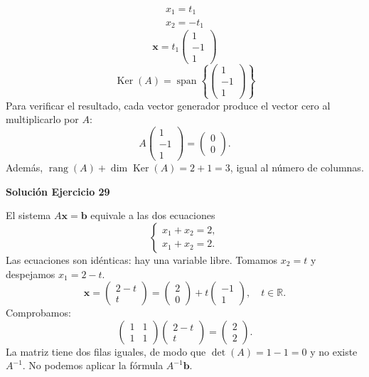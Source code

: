 \documentclass[12pt]{article}
\newcommand{\rang}{\operatorname{rang}}
\newcommand{\Ker}{\operatorname{Ker}}
\newcommand{\vect}[1]{\boldsymbol{#1}}
\begin{document}
\[
\begin{aligned}x_{1}=t_{1}\\x_{2}=- t_{1}\end{aligned}
\]
\[
\vect x=t_{1}\begin{pmatrix}1\\-1\\1\end{pmatrix}
\]
\[
\boxed{\Ker(A)=\operatorname{span}\left\{\begin{pmatrix}1\\-1\\1\end{pmatrix}\right\}}
\]
Para verificar el resultado, cada vector generador produce el vector cero al multiplicarlo por $A$:
\[
A\begin{pmatrix}1\\-1\\1\end{pmatrix}=\begin{pmatrix}0\\0\end{pmatrix}.
\]
Además, $\rang(A)+\dim\Ker(A)=2+1=3$, igual al número de columnas.


\par\bigskip\noindent\textbf{Solución Ejercicio 29}\par\nobreak
El sistema $A\vect x=\vect b$ equivale a las dos ecuaciones
\[
\begin{cases}x_1+x_2=2,\\x_1+x_2=2.\end{cases}
\]
Las ecuaciones son idénticas: hay una variable libre. Tomamos $x_2=t$ y despejamos $x_1=2-t$.
\[
\boxed{\vect x=\begin{pmatrix}2-t\\t\end{pmatrix}=\begin{pmatrix}2\\0\end{pmatrix}+t\begin{pmatrix}-1\\1\end{pmatrix},\quad t\in\mathbb R}.
\]
Comprobamos:
\[
\begin{pmatrix}1&1\\1&1\end{pmatrix}\begin{pmatrix}2-t\\t\end{pmatrix}=\begin{pmatrix}2\\2\end{pmatrix}.
\]
La matriz tiene dos filas iguales, de modo que $\det(A)=1-1=0$ y no existe $A^{-1}$. No podemos aplicar la fórmula $A^{-1}\vect b$.
\end{document}

